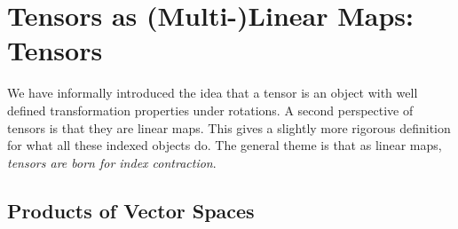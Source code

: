 \documentclass[12pt]{article}
\begin{document}
\section{Tensors as (Multi-)Linear Maps: Tensors}

We have informally introduced the idea that a tensor is an object with well defined transformation properties under rotations. A second perspective of tensors is that they are linear maps. This gives a slightly more rigorous definition for what all these indexed objects do. The general theme is that as linear maps, \emph{tensors are born for index contraction}.

\subsection{Products of Vector Spaces}
\end{document}
